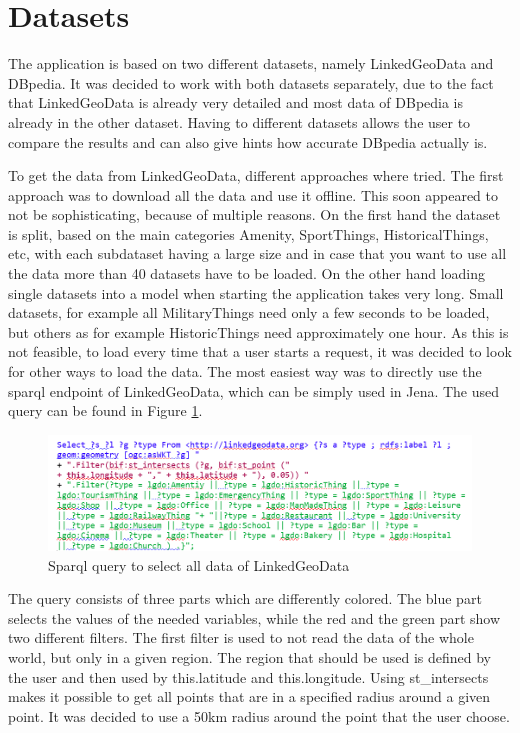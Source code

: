 \section{Datasets}
The application is based on two different datasets, namely LinkedGeoData and DBpedia. It was decided to work with both datasets separately, due to the fact that LinkedGeoData is already very detailed and most data of DBpedia is already in the other dataset. Having to different datasets allows the user to compare the results and can also give hints how accurate DBpedia actually is. 

To get the data from LinkedGeoData, different approaches where tried. The first approach was to download all the data and use it offline. This soon appeared to not be sophisticating, because of multiple reasons. On the first hand the dataset is split, based on the main categories Amenity, SportThings, HistoricalThings, etc, with each subdataset having a large size and in case that you want to use all the data more than 40 datasets have to be loaded. On the other hand loading single datasets into a model when starting the application takes very long. Small datasets, for example all MilitaryThings need only a few seconds to be loaded, but others as for example HistoricThings need approximately one hour. As this is not feasible, to load every time that a user starts a request, it was decided to look for other ways to load the data. The most easiest way was to directly use the sparql endpoint of LinkedGeoData, which can be simply used in Jena. The used query can be found in Figure \ref{fig:sparqlLGD}. 

\begin{figure}
	\centering
	\includegraphics[scale=0.7]{./content/sparqlLGD.png}
	\caption{Sparql query to select all data of LinkedGeoData}\label{fig:sparqlLGD}
\end{figure}

The query consists of three parts which are differently colored. The blue part selects the values of the needed variables, while the red and the green part show two different filters. The first filter is used to not read the data of the whole world, but only in a given region. The region that should be used is defined by the user and then used by this.latitude and this.longitude. Using st\_intersects makes it possible to get all points that are in a specified radius around a given point. It was decided to use a 50km radius around the point that the user choose. 

